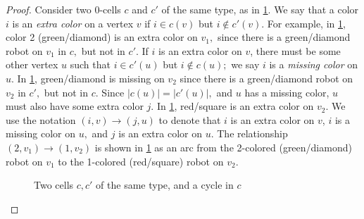 \documentclass{amsart}
\newcommand{\quaad}{\quad\quad}
\newcommand{\vertex}[3][1]{
\node [circle,  fill, inner sep = 0pt,outer sep = 0pt, minimum size=#1mm] (#3) at #2 {};
}
\newcommand{\fg}[1]{
    \pgfdeclarelayer{foreground}
    \pgfsetlayers{main,foreground}
    \begin{pgfonlayer}{foreground}
    #1
    \end{pgfonlayer}
    }
\newcommand{\Xgraph}{
    \fg{\vertex{(0,-1.25)}{A}
    \vertex{(0,0)}{B}
    \vertex{(1.25,0)}{C}
    \vertex{(0,1.25)}{D}
    \vertex{(-1.25,0)}{E}
    \draw (A) -- (D);
    \draw (C) -- (E);
    }
}
\newcommand{\RedRobot}[2]{
\node [rectangle, cbred, fill, inner sep = 0pt,outer sep = 1pt, minimum size=2.3mm] (#2) at #1 {};
}
\newcommand{\GreenRobot}[2]{
\node [diamond, cbgreen, fill, inner sep = 0pt,outer sep = 1pt,minimum size=3mm] (#2) at #1 {};
}
\newcommand{\BlueRobot}[2]{
\node [isosceles triangle, shape border rotate=90,cbblue, fill, inner sep = 0pt,outer sep = 1pt,minimum size=2.5mm] (#2) at #1 {};
}
\newcommand{\YellowRobot}[2]{
\node [star, cbyellow, fill, inner sep = 0pt,outer sep = 1pt,minimum size=3.2mm] (#2) at #1 {};
}
\theoremstyle{definition}
\theoremstyle{remark}
\begin{document}
\begin{proof}
Consider two 0-cells $c$ and $c'$ of the same type, as in \cref{fig:sameType2}. We say that a color $i$ is an \textit{extra color} on a vertex $v$ if $i\in c(v)$ but $i\notin c'(v).$ For example, in \cref{fig:sameType2}, color 2 (green/diamond) is an extra color on $v_1,$ since there is a green/diamond robot on $v_1$ in $c,$ but not in $c'.$ If $i$ is an extra color on $v$, there must be some other vertex $u$ such that $i\in c'(u)$ but $i\notin c(u);$ we say $i$ is a \textit{missing color} on $u$. In \cref{fig:sameType2}, green/diamond is missing on $v_2$ since there is a green/diamond robot on $v_2$ in $c',$ but not in $c.$ Since $|c(u)|=|c'(u)|,$ and $u$ has a missing color, $u$ must also have some extra color $j$. In \cref{fig:sameType2}, red/square is an extra color on $v_2$. We use the notation $(i,v)\to(j,u)$ to denote that $i$ is an extra color on $v$, $i$ is a missing color on $u,$ and $j$ is an extra color on $u.$ The relationship $(2,v_1)\to(1,v_2)$ is shown in \cref{fig:sameType2} as an arc from the 2-colored (green/diamond) robot on $v_1$ to the 1-colored (red/square) robot on $v_2.$

\begin{figure}[h!]
    \centering
    \quaad  
    \caption{Two cells $c,c'$ of the same type, and a cycle in $c$}
    \label{fig:sameType2}
\end{figure}


\end{proof}
\end{document}
